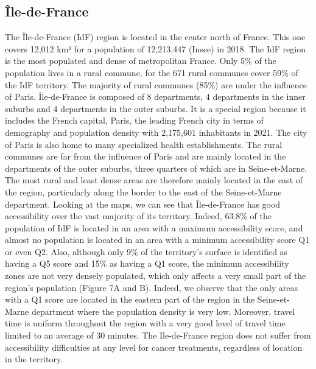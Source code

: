 \subsection*{Île-de-France}

The Île-de-France (IdF) region is located in the center north of France. This one covers 12,012 km² for a population of 12,213,447 (Insee) in 2018. The IdF region is the most populated and dense of metropolitan France. Only 5\% of the population lives in a rural commune, for the 671 rural communes cover 59\% of the IdF territory. The majority of rural communes (85\%) are under the influence of Paris. Île-de-France is composed of 8 departments, 4 departments in the inner suburbs and 4 departments in the outer suburbs. It is a special region because it includes the French capital, Paris, the leading French city in terms of demography and population density with 2,175,601 inhabitants in 2021. The city of Paris is also home to many specialized health establishments. The rural communes are far from the influence of Paris and are mainly located in the departments of the outer suburbs, three quarters of which are in Seine-et-Marne. The most rural and least dense areas are therefore mainly located in the east of the region, particularly along the border to the east of the Seine-et-Marne department. Looking at the maps, we can see that Île-de-France has good accessibility over the vast majority of its territory. Indeed, 63.8\% of the population of IdF is located in an area with a maximum accessibility score, and almost no population is located in an area with a minimum accessibility score Q1 or even Q2. Also, although only 9\% of the territory's surface is identified as having a Q5 score and 15\% as having a Q1 score, the minimum accessibility zones are not very densely populated, which only affects a very small part of the region's population (Figure 7A and B). Indeed, we observe that the only areas with a Q1 score are located in the eastern part of the region in the Seine-et-Marne department where the population density is very low. Moreover, travel time is uniform throughout the region with a very good level of travel time limited to an average of 30 minutes. The Ile-de-France region does not suffer from accessibility difficulties at any level for cancer treatments, regardless of location in the territory.

